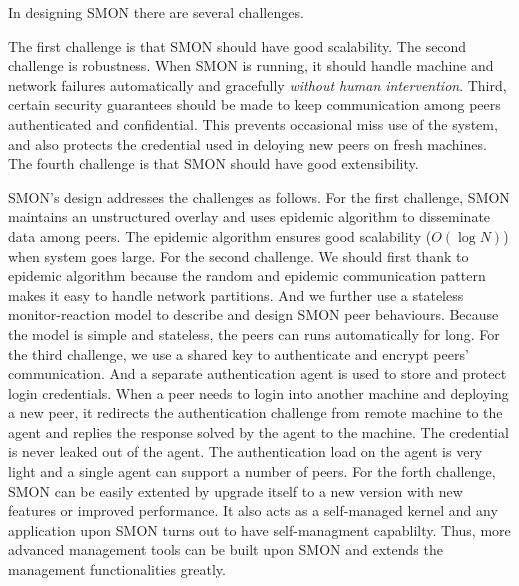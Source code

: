 
In designing SMON there are several challenges.

The first challenge is that SMON should have good
scalability. The second challenge is robustness. When SMON
is running, it should handle machine and network failures
automatically and gracefully \emph{without human
intervention}. Third, certain security guarantees should be
made to keep communication among peers authenticated and
confidential. This prevents occasional miss use of the
system, and also protects the credential used in deloying
new peers on fresh machines. The fourth challenge is that
SMON should have good extensibility.

SMON's design addresses the challenges as follows. For the
first challenge, SMON maintains an unstructured overlay and
uses epidemic algorithm to disseminate data among peers. The
epidemic algorithm ensures good scalability ($O(\log N)$)
when system goes large. For the second challenge. We should
first thank to epidemic algorithm because the random and
epidemic communication pattern makes it easy to handle
network partitions. And we further use a stateless
monitor-reaction model to describe and design SMON peer
behaviours. Because the model is simple and stateless, the
peers can runs automatically for long. For the third
challenge, we use a shared key to authenticate and encrypt
peers' communication. And a separate authentication agent is
used to store and protect login credentials. When a peer
needs to login into another machine and deploying a new
peer, it redirects the authentication challenge from remote
machine to the agent and replies the response solved by the
agent to the machine. The credential is never leaked out of
the agent. The authentication load on the agent is very
light and a single agent can support a number of peers. For
the forth challenge, SMON can be easily extented by upgrade
itself to a new version with new features or improved
performance. It also acts as a self-managed kernel and any
application upon SMON turns out to have self-managment
capablilty. Thus, more advanced management tools can be
built upon SMON and extends the management functionalities
greatly.


